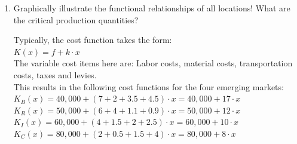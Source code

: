 \begin{enumerate}
	\item Graphically illustrate the functional relationships of all locations! What are the critical production quantities?
	\begin{solution}
		Typically, the cost function takes the form:\\
		$K\left(x\right)=f+k\cdot x$\\
		
		The variable cost items here are: Labor costs, material costs, transportation costs, taxes and levies.\\
	This results in the following cost functions for the four emerging markets:\\
		
		$K_B\left(x\right)=40,000+\left(7+2+3.5+4.5\right)\cdot x=40,000+17\cdot x$\\
		$K_R\left(x\right)=50,000+\left(6+4+1.1+0.9\right)\cdot x=50,000+12\cdot x$\\
		$K_I\left(x\right)=60,000+\left(4+1.5+2+2.5\right)\cdot x=60,000+10\cdot x$\\
		$K_C\left(x\right)=80,000+\left(2+0.5+1.5+4\right)\cdot x=80,000+8\cdot x$\\
		

\end{solution}
\end{enumerate}
